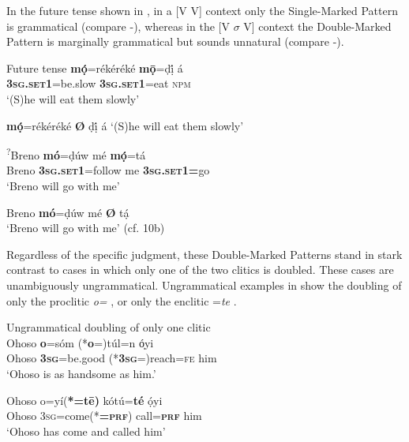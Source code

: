 \documentclass[output=paper]{langsci/langscibook}
\begin{document}
In the future tense shown in , in a [V V] context only the Single-Marked Pattern is grammatical (compare -), whereas in the [V $\sigma $ V] context the Double-Marked Pattern is marginally grammatical but sounds unnatural (compare -). 

\ea\label{ex:rolle:fut} {Future tense}
   \ea\label{ex:rolle:28}
\gll   *\textbf{m\'{ọ}}=rékéréké    \textbf{m\={ọ}}=ḍị́       á    \\
     \textbf{\textsc{3sg.set1}}=be.slow  \textbf{\textsc{3sg}}\textbf{.}\textbf{\textsc{set1}}=eat  \textsc{npm}\\
\glt ‘(S)he will eat them slowly’

\ex\label{ex:rolle:29}
 \textbf{mọ́}=rékéréké \textbf{Ø} ḍị́ á 
\glt ‘(S)he will eat them slowly’

\ex\label{ex:rolle:30}
\gll   \textsuperscript{?}Breno  \textbf{mó}=ḍúw    mé   \textbf{m\'{ọ}}=tá    \\
     Breno     \textbf{\textsc{3sg.set1}}=follow  me  \textbf{\textsc{3sg.set1=}}go\\
\glt ‘Breno will go with me’

\ex\label{ex:rolle:31}
   Breno \textbf{mó}=ḍúw mé \textbf{Ø} t\'{ạ}\\
\glt ‘Breno will go with me’ (cf. 10b)
\z
\z  

Regardless of the specific judgment, these Double-Marked Patterns stand in stark contrast to cases in which only one of the two clitics is doubled. These cases are unambiguously ungrammatical. Ungrammatical examples in  show the doubling of only the proclitic \textit{o=} , or only the enclitic =\textit{te} . 

\ea\label{ex:rolle:ug}
{Ungrammatical doubling of only one clitic}\\
  \ea\label{ex:rolle:32}
\gll   Ohoso   \textbf{o}=sóm       (*\textbf{o}=)túl=n       \'o̩yi\\
       Ohoso  \textbf{\textsc{3sg}}=be.good   (*\textbf{\textsc{3sg}}=)reach=\textsc{fe}     him\\
\glt ‘Ohoso is as handsome as him.’

\ex\label{ex:rolle:33}
\gll   Ohoso  o=yí(\textbf{*=tē)}      kótú=\textbf{té}    ọ́yi\\
       Ohoso  \textsc{3sg}=come(*\textbf{=}\textbf{\textsc{prf}})  call=\textbf{\textsc{prf}}    him\\
\glt ‘Ohoso has come and called him’ \citep[285]{Kari2003a}
\z
\z 
\end{document}
